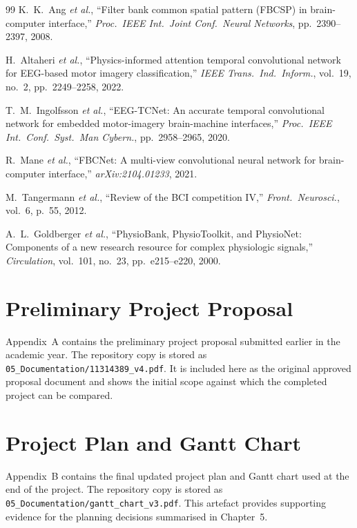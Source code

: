 \documentclass[12pt, a4paper]{article}
\begin{document}
\begin{thebibliography}{99}
K.~K.~Ang \emph{et al.}, ``Filter bank common spatial pattern (FBCSP) in brain-computer interface,'' \textit{Proc.\ IEEE Int.\ Joint Conf.\ Neural Networks}, pp.~2390--2397, 2008.

H.~Altaheri \emph{et al.}, ``Physics-informed attention temporal convolutional network for EEG-based motor imagery classification,'' \textit{IEEE Trans.\ Ind.\ Inform.}, vol.~19, no.~2, pp.~2249--2258, 2022.

T.~M.~Ingolfsson \emph{et al.}, ``EEG-TCNet: An accurate temporal convolutional network for embedded motor-imagery brain-machine interfaces,'' \textit{Proc.\ IEEE Int.\ Conf.\ Syst.\ Man Cybern.}, pp.~2958--2965, 2020.

R.~Mane \emph{et al.}, ``FBCNet: A multi-view convolutional neural network for brain-computer interface,'' \textit{arXiv:2104.01233}, 2021.

M.~Tangermann \emph{et al.}, ``Review of the BCI competition IV,'' \textit{Front.\ Neurosci.}, vol.~6, p.~55, 2012.

A.~L.~Goldberger \emph{et al.}, ``PhysioBank, PhysioToolkit, and PhysioNet: Components of a new research resource for complex physiologic signals,'' \textit{Circulation}, vol.~101, no.~23, pp.~e215--e220, 2000.
\end{thebibliography}

\clearpage
\appendix

\section{Preliminary Project Proposal}

Appendix~A contains the preliminary project proposal submitted earlier in the academic year. The repository copy is stored as \texttt{05\_Documentation/11314389\_v4.pdf}. It is included here as the original approved proposal document and shows the initial scope against which the completed project can be compared.



\section{Project Plan and Gantt Chart}

Appendix~B contains the final updated project plan and Gantt chart used at the end of the project. The repository copy is stored as \texttt{05\_Documentation/gantt\_chart\_v3.pdf}. This artefact provides supporting evidence for the planning decisions summarised in Chapter~5.
\end{document}
